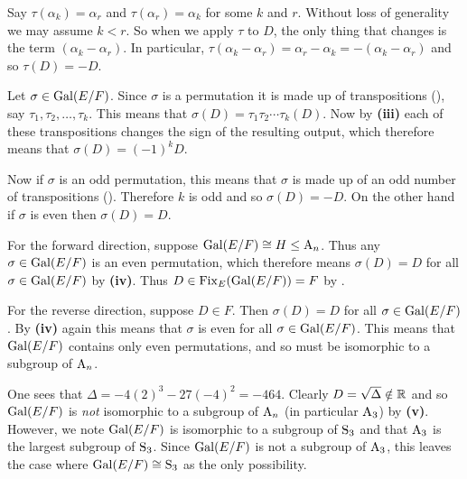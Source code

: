 \begin{questions}
\begin{partquestions}{\roman*}
        \item Say $\tau(\alpha_k) = \alpha_r$ and $\tau(\alpha_r) = \alpha_k$ for some $k$ and $r$. Without loss of generality we may assume $k < r$. So when we apply $\tau$ to $D$, the only thing that changes is the term $(\alpha_k - \alpha_r)$. In particular, $\tau(\alpha_k - \alpha_r) = \alpha_r - \alpha_k = -(\alpha_k - \alpha_r)$ and so $\tau(D) = -D$.

        \item Let $\sigma \in \mathrm{Gal}(E/F)$. Since $\sigma$ is a permutation it is made up of transpositions (), say $\tau_1, \tau_2, \dots, \tau_k$. This means that $\sigma(D) = \tau_1\tau_2\cdots\tau_k(D)$. Now by \textbf{(iii)} each of these transpositions changes the sign of the resulting output, which therefore means that $\sigma(D) = (-1)^kD$.

        Now if $\sigma$ is an odd permutation, this means that $\sigma$ is made up of an odd number of transpositions (). Therefore $k$ is odd and so $\sigma(D) = -D$. On the other hand if $\sigma$ is even then $\sigma(D) = D$.

        \item For the forward direction, suppose $\mathrm{Gal}(E/F) \cong H \leq \mathrm{A}_{n}$. Thus any $\sigma \in \mathrm{Gal}(E/F)$ is an even permutation, which therefore means $\sigma(D) = D$ for all $\sigma \in \mathrm{Gal}(E/F)$ by \textbf{(iv)}. Thus $D \in \mathrm{Fix}_{E}(\mathrm{Gal}(E/F)) = F$ by .

        For the reverse direction, suppose $D \in F$. Then $\sigma(D) = D$ for all $\sigma \in \mathrm{Gal}(E/F)$. By \textbf{(iv)} again this means that $\sigma$ is even for all $\sigma \in \mathrm{Gal}(E/F)$. This means that $\mathrm{Gal}(E/F)$ contains only even permutations, and so must be isomorphic to a subgroup of $\mathrm{A}_{n}$.

        \item One sees that $\Delta = -4(2)^3 - 27(-4)^2 = -464$. Clearly $D = \sqrt{\Delta} \notin \mathbb{R}$ and so $\mathrm{Gal}(E/F)$ is \textit{not} isomorphic to a subgroup of $\mathrm{A}_{n}$ (in particular $\mathrm{A}_{3}$) by \textbf{(v)}. However, we note $\mathrm{Gal}(E/F)$ is isomorphic to a subgroup of $\mathrm{S}_{3}$ and that $\mathrm{A}_{3}$ is the largest subgroup of $\mathrm{S}_{3}$. Since $\mathrm{Gal}(E/F)$ is not a subgroup of $\mathrm{A}_{3}$, this leaves the case where $\mathrm{Gal}(E/F) \cong \mathrm{S}_{3}$ as the only possibility.
    \end{partquestions}
\end{questions}
